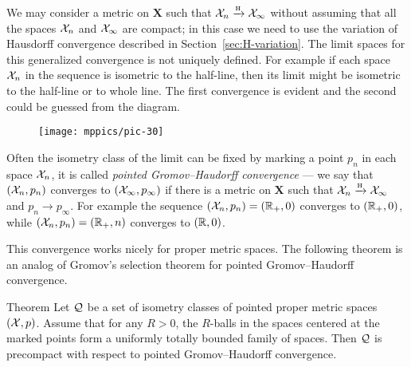 We may consider a metric on $\bm{X}$ such that $\mathcal{X}_n\xrightarrow{\mbox{\tiny H}} \mathcal{X}_\infty$ without assuming that all the spaces $\mathcal{X}_n$ and $\mathcal{X}_\infty$ are compact; in this case we need to use the variation of Hausdorff convergence described in Section~\ref{sec:H-variation}.
The limit spaces for this generalized convergence is not uniquely defined.
For example if each space $\mathcal{X}_n$ in the sequence is isometric to the half-line, then its limit might be isometric to the half-line or to whole line.
The first convergence is evident and the second could be guessed from the diagram.

\begin{figure}[h!]
\vskip-0mm
\centering
\texttt{[image: mppics/pic-30]}
\end{figure}

Often the isometry class of the limit can be fixed by marking a point $p_n$ in each space $\mathcal{X}_n$, it is called \emph{pointed Gromov--Haudorff convergence} --- we say that $(\mathcal{X}_n,p_n)$ converges to $(\mathcal{X}_\infty,p_\infty)$ if there is a metric on $\bm{X}$ such that $\mathcal{X}_n\xrightarrow{\mbox{\tiny H}} \mathcal{X}_\infty$ and $p_n\to p_\infty$.
For example the sequence $(\mathcal{X}_n,p_n)=(\mathbb{R}_+,0)$ converges to $(\mathbb{R}_+,0)$, while $(\mathcal{X}_n,p_n)=(\mathbb{R}_+,n)$ converges to $(\mathbb{R},0)$.

This convergence works nicely for proper metric spaces.
The following theorem is an analog of Gromov's selection theorem for pointed Gromov--Haudorff convergence.

\begin{thm}{Theorem}\label{thm:pointed-gromov-compactness}%
Let $\mathcal{Q}$ be a set of isometry classes of pointed proper metric spaces
$(\mathcal{X},p)$.
Assume that for any $R>0$, the $R$-balls in the spaces centered at the marked points form a uniformly totally bounded family of spaces.
Then $\mathcal{Q}$ is precompact with respect to pointed Gromov--Haudorff convergence. 
\end{thm}

